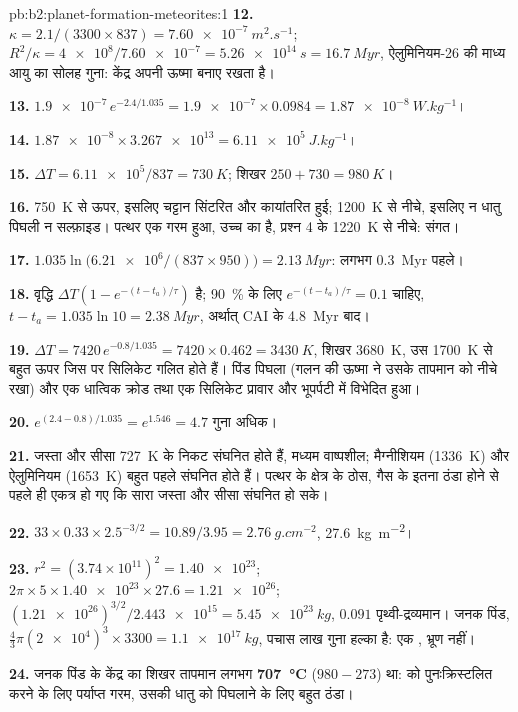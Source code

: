\begin{solution}{pb:b2:planet-formation-meteorites:1}
\textbf{12.} $\kappa = 2.1/(3300\times837) = \qty{7.60e-7}{m^2.s^{-1}}$;
$R^2/\kappa = \num{4e8}/\num{7.60e-7} = \qty{5.26e14}{s} = \qty{16.7}{Myr}$, ऐलुमिनियम-26 की
माध्य आयु का सोलह गुना: केंद्र अपनी ऊष्मा बनाए रखता है।

\textbf{13.} $\num{1.9e-7}\,e^{-2.4/1.035} = \num{1.9e-7}\times0.0984 =
\qty{1.87e-8}{W.kg^{-1}}$।

\textbf{14.} $\num{1.87e-8}\times\num{3.267e13} = \qty{6.11e5}{J.kg^{-1}}$।

\textbf{15.} $\Delta T = \num{6.11e5}/837 = \qty{730}{K}$; शिखर
$250 + 730 = \qty{980}{K}$।

\textbf{16.} \qty{750}{K} से ऊपर, इसलिए चट्टान सिंटरित और कायांतरित हुई;
\qty{1200}{K} से नीचे, इसलिए न धातु पिघली न सल्फ़ाइड। पत्थर एक गरम हुआ, उच्च  का
 है, प्रश्न 4 के \qty{1220}{K} से नीचे: संगत।

\textbf{17.} $1.035\ln\bigl(\num{6.21e6}/(837\times950)\bigr) = \qty{2.13}{Myr}$:
लगभग \qty{0.3}{Myr} पहले।

\textbf{18.} वृद्धि $\Delta T(1 - e^{-(t - t_a)/\tau})$ है; \qty{90}{\percent}
के लिए $e^{-(t - t_a)/\tau} = 0.1$ चाहिए, $t - t_a = 1.035\ln10 = \qty{2.38}{Myr}$, अर्थात्
CAI के \qty{4.8}{Myr} बाद।

\textbf{19.} $\Delta T = 7420\,e^{-0.8/1.035} = 7420\times0.462 = \qty{3430}{K}$,
शिखर \qty{3680}{K}, उस \qty{1700}{K} से बहुत ऊपर जिस पर सिलिकेट गलित होते हैं।
पिंड पिघला (गलन की ऊष्मा ने उसके तापमान को नीचे रखा) और
एक धात्विक क्रोड तथा एक सिलिकेट प्रावार और भूपर्पटी में विभेदित हुआ।

\textbf{20.} $e^{(2.4 - 0.8)/1.035} = e^{1.546} = 4.7$ गुना अधिक।

\textbf{21.} जस्ता और सीसा \qty{727}{K} के निकट संघनित होते हैं, मध्यम वाष्पशील; मैग्नीशियम
(\qty{1336}{K}) और ऐलुमिनियम (\qty{1653}{K}) बहुत पहले संघनित होते हैं। पत्थर के क्षेत्र के
ठोस, गैस के इतना ठंडा होने से पहले ही एकत्र हो गए कि सारा जस्ता और
सीसा संघनित हो सके।

\textbf{22.} $33\times0.33\times2.5^{-3/2} = 10.89/3.95 = \qty{2.76}{g.cm^{-2}}$,
\qty{27.6}{kg.m^{-2}}।

\textbf{23.} $r^2 = (3.74\times10^{11})^2 = \num{1.40e23}$;
$2\pi\times5\times\num{1.40e23}\times27.6 = \num{1.21e26}$;
$(\num{1.21e26})^{3/2}/\num{2.443e15} = \qty{5.45e23}{kg}$, $0.091$ पृथ्वी-द्रव्यमान।
जनक पिंड, $\tfrac43\pi(\num{2e4})^3\times3300 = \qty{1.1e17}{kg}$, पचास
लाख गुना हल्का है: एक , भ्रूण नहीं।

\textbf{24.} जनक पिंड के केंद्र का शिखर तापमान लगभग
\textbf{\qty[text-series-to-math=true]{707}{\degreeCelsius}} ($980 - 273$) था:  को
पुनःक्रिस्टलित करने के लिए पर्याप्त गरम, उसकी धातु को पिघलाने के लिए बहुत ठंडा।
\end{solution}
